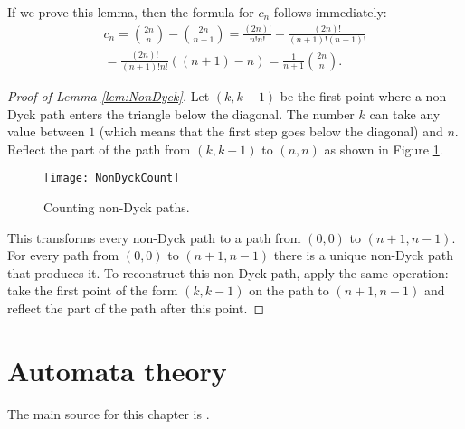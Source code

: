 \begin{page}
\setcounter{section}{0}
\setcounter{subsection}{0}
\setcounter{dfn}{10}
\label{portion:891}


If we prove this lemma, then the formula for $c_n$ follows immediately:
\begin{multline*}
c_n = \binom{2n}{n} - \binom{2n}{n-1} = \frac{(2n)!}{n!n!} - \frac{(2n)!}{(n+1)!(n-1)!}\\
= \frac{(2n)!}{(n+1)!n!}((n+1) - n) = \frac{1}{n+1} \binom{2n}{n}.
\end{multline*}


\begin{proof}[Proof of Lemma \ref{lem:NonDyck}]
Let $(k,k-1)$ be the first point where a non-Dyck path enters the triangle below the diagonal.
The number $k$ can take any value between $1$ (which means that the first step goes below the diagonal) and $n$.
Reflect the part of the path from $(k,k-1)$ to $(n,n)$ as shown in Figure \ref{fig:NonDyckCount}.

\begin{figure}[ht]
\begin{center}
\texttt{[image: NonDyckCount]}
\end{center}
\caption{Counting non-Dyck paths.}
\label{fig:NonDyckCount}
\end{figure}

This transforms every non-Dyck path to a path from $(0,0)$ to $(n+1,n-1)$.
For every path from $(0,0)$ to $(n+1,n-1)$ there is a unique non-Dyck path that produces it.
To reconstruct this non-Dyck path, apply the same operation: take the first point of the form $(k,k-1)$ on the path to $(n+1,n-1)$
and reflect the part of the path after this point.
\end{proof}




\end{page}

\begin{page}
\setcounter{section}{1}
\setcounter{subsection}{0}
\setcounter{dfn}{10}
\label{portion:892}

\chapter{Automata theory}
The main source for this chapter is \cite{HU79}.

\end{page}

